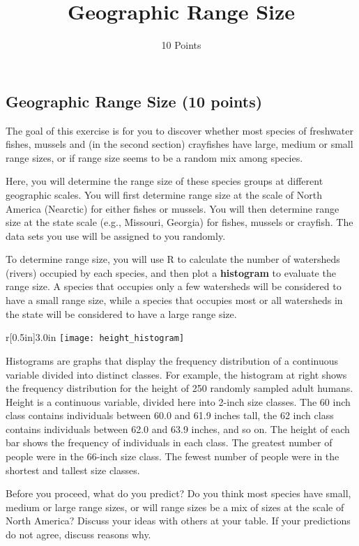\documentclass[11pt]{article}
\title{Geographic Range Size}
\author{10 Points}
\date{}                                           %
\newcommand*{\assignmentTitle}{Geographic Range Size}
\begin{document}
\thispagestyle{first_page}

\subsection*{\assignmentTitle{} (10 points)}

The goal of this exercise is for you to discover whether most species of
freshwater fishes, mussels and (in the second section) crayfishes have
large, medium or small range sizes, or if range size seems to be a
random mix among species.

Here, you will determine the range size of these species groups at
different geographic scales. You will first determine range size at the
scale of North America (Nearctic) for either fishes or mussels. You will
then determine range size at the state scale (e.g., Missouri, Georgia)
for fishes, mussels or crayfish. The data sets you use will be assigned
to you randomly.

To determine range
size, you will use R to calculate the number of watersheds (rivers)
occupied by each species, and then plot a \textbf{histogram} to evaluate
the range size. A species that occupies only a few watersheds will be
considered to have a small range size, while a species that occupies
most or all watersheds in the state will be considered to have a large
range size.

\begin{wrapfigure}[17]{r}[0.5in]{3.0in}
	\texttt{[image: height\_histogram]}
\end{wrapfigure}
Histograms are graphs that display
the frequency distribution of a continuous variable divided into distinct
classes. For example, the histogram at right shows the frequency distribution for
the height of 250 randomly sampled adult humans. Height is a continuous variable, divided here into 2-inch size classes.
The 60 inch class contains individuals between 60.0 and 61.9 inches tall,
the 62 inch class contains individuals between 62.0 and 63.9 inches, and so on. The 
height of each bar shows the frequency of individuals in each class. The greatest
number of people were in the 66-inch size class. The fewest number of people were
in the shortest and tallest size classes.



Before you proceed, what do you predict? Do you think most species
have small, medium or large range sizes, or will range sizes be a mix of
sizes at the scale of North America? Discuss your ideas with others at your table. If
your predictions do not agree, discuss reasons why.
\end{document}
